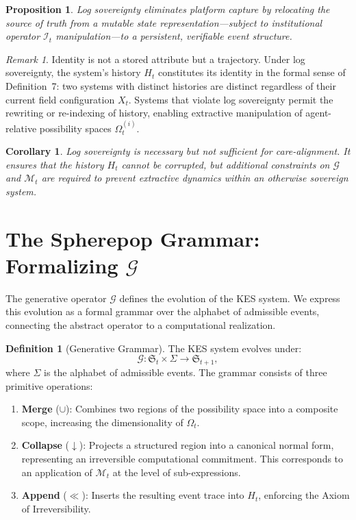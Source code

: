 \documentclass[11pt,a4paper]{article}
\newtheorem{proposition}[theorem]{Proposition}
\newtheorem{corollary}[theorem]{Corollary}
\theoremstyle{definition}
\newtheorem{definition}[theorem]{Definition}
\theoremstyle{remark}
\newtheorem{remark}[theorem]{Remark}
\begin{document}
\begin{proposition}
Log sovereignty eliminates platform capture by relocating the source of truth from a mutable state representation---subject to institutional operator $\mathcal{I}_t$ manipulation---to a persistent, verifiable event structure.
\end{proposition}

\begin{remark}
Identity is not a stored attribute but a trajectory. Under log sovereignty, the system's history $H_t$ constitutes its identity in the formal sense of Definition~7: two systems with distinct histories are distinct regardless of their current field configuration $X_t$. Systems that violate log sovereignty permit the rewriting or re-indexing of history, enabling extractive manipulation of agent-relative possibility spaces $\Omega_t^{(i)}$.
\end{remark}

\begin{corollary}
Log sovereignty is necessary but not sufficient for care-alignment. It ensures that the history $H_t$ cannot be corrupted, but additional constraints on $\mathcal{G}$ and $\mathcal{M}_t$ are required to prevent extractive dynamics within an otherwise sovereign system.
\end{corollary}

\section{The Spherepop Grammar: Formalizing $\mathcal{G}$}

The generative operator $\mathcal{G}$ defines the evolution of the KES system. We express this evolution as a formal grammar over the alphabet of admissible events, connecting the abstract operator to a computational realization.

\begin{definition}[Generative Grammar]
The KES system evolves under:
\[
\mathcal{G} : \mathfrak{S}_t \times \Sigma \to \mathfrak{S}_{t+1},
\]
where $\Sigma$ is the alphabet of admissible events. The grammar consists of three primitive operations:
\begin{enumerate}
\item \textbf{Merge} ($\cup$): Combines two regions of the possibility space into a composite scope, increasing the dimensionality of $\Omega_t$.
\item \textbf{Collapse} ($\downarrow$): Projects a structured region into a canonical normal form, representing an irreversible computational commitment. This corresponds to an application of $\mathcal{M}_t$ at the level of sub-expressions.
\item \textbf{Append} ($\ll$): Inserts the resulting event trace into $H_t$, enforcing the Axiom of Irreversibility.
\end{enumerate}
\end{definition}
\end{document}
